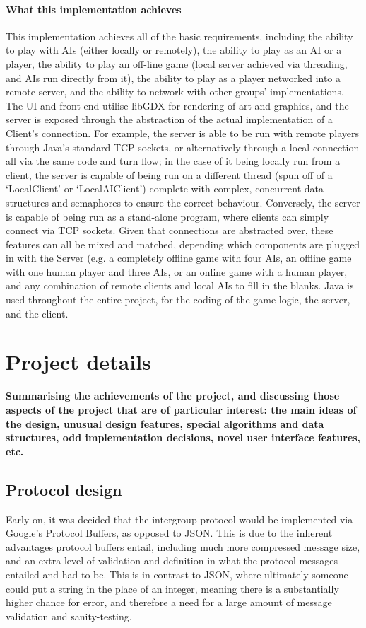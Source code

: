 \documentclass[a4paper,doc,draftfirst]{apa6}
\begin{document}
\paragraph{What this implementation achieves}
This implementation achieves all of the basic requirements, including the ability to play with AIs (either locally or remotely), the ability to play as an AI or a player, the ability to play an off-line game (local server achieved via threading, and AIs run directly from it), the ability to play as a player networked into a remote server, and the ability to network with other groups’ implementations. The UI and front-end utilise libGDX for rendering of art and graphics, and the server is exposed through the abstraction of the actual implementation of a Client’s connection. For example, the server is able to be run with remote players through Java’s standard TCP sockets, or alternatively through a local connection all via the same code and turn flow; in the case of it being locally run from a client, the server is capable of being run on a different thread (spun off of a ‘LocalClient’ or ‘LocalAIClient’) complete with complex, concurrent data structures and semaphores to ensure the correct behaviour. Conversely, the server is capable of being run as a stand-alone program, where clients can simply connect via TCP sockets. Given that connections are abstracted over, these features can all be mixed and matched, depending which components are plugged in with the Server (e.g. a completely offline game with four AIs, an offline game with one human player and three AIs, or an online game with a human player, and any combination of remote clients and local AIs to fill in the blanks. Java is used throughout the entire project, for the coding of the game logic, the server, and the client.





\section{Project details}
\textbf{Summarising the achievements of the project, and discussing those aspects of the project that are of particular interest: the main ideas of the design, unusual design features, special algorithms and data structures, odd implementation decisions, novel user interface features, etc.}

\subsection{Protocol design}
Early on, it was decided that the intergroup protocol would be implemented via Google’s Protocol Buffers, as opposed to JSON. This is due to the inherent advantages protocol buffers entail, including much more compressed message size, and an extra level of validation and definition in what the protocol messages entailed and had to be. This is in contrast to JSON, where ultimately someone could put a string in the place of an integer, meaning there is a substantially higher chance for error, and therefore a need for a large amount of message validation and sanity-testing.
\end{document}
